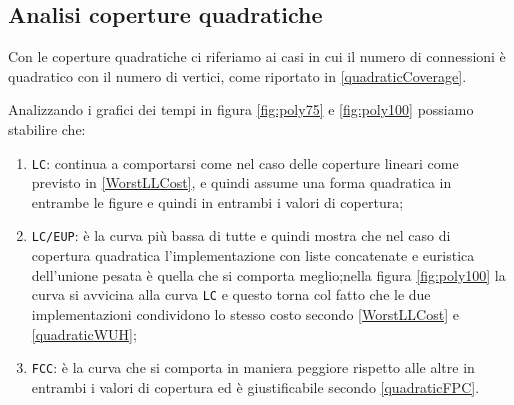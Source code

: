 \subsection{Analisi coperture quadratiche}
Con le coperture quadratiche ci riferiamo ai casi in cui il numero di connessioni è quadratico con il numero di vertici, come riportato in \eqref{quadraticCoverage}.

Analizzando i grafici dei tempi in figura \ref{fig:poly75} e \ref{fig:poly100} possiamo stabilire che:
\begin{enumerate}
    \item \texttt{LC}: continua a comportarsi come nel caso delle coperture lineari come previsto in \eqref{WorstLLCost}, e quindi assume una forma quadratica
          in entrambe le figure e quindi in entrambi i valori di copertura;
    \item \texttt{LC/EUP}: è la curva più bassa di tutte e quindi mostra che nel caso di copertura quadratica l'implementazione con liste concatenate e euristica dell'unione
          pesata è quella che si comporta meglio;nella figura \ref{fig:poly100} la curva si avvicina alla curva \texttt{LC} e questo
          torna col fatto che le due implementazioni condividono lo stesso costo secondo \eqref{WorstLLCost} e \eqref{quadraticWUH};
    \item \texttt{FCC}: è la curva che si comporta in maniera peggiore rispetto alle altre in entrambi i valori di copertura ed è giustificabile secondo
          \eqref{quadraticFPC}.
\end{enumerate}

